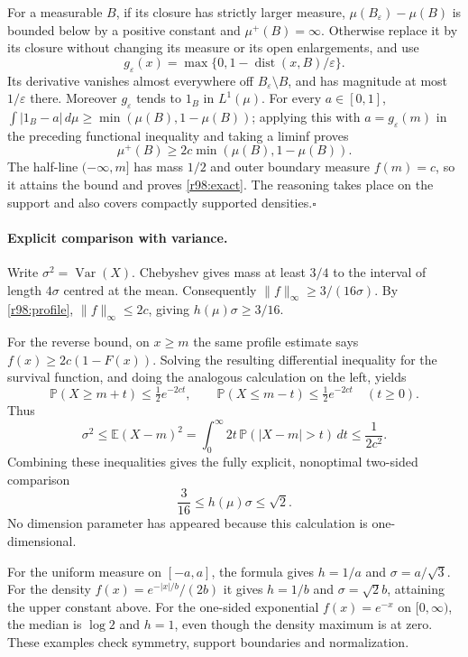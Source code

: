 \documentclass[11pt]{article}
\begin{document}
For a measurable $B$, if its closure has strictly larger measure,
$\mu(B_\varepsilon)-\mu(B)$ is bounded below by a positive constant
and $\mu^+(B)=\infty$. Otherwise replace it by its closure without
changing its measure or its open enlargements, and use
\[
                 g_\varepsilon(x)=
                 \max\{0,1-\operatorname{dist}(x,B)/\varepsilon\}.
\]
Its derivative vanishes almost everywhere off
$B_\varepsilon\setminus B$, and has magnitude at most
$1/\varepsilon$ there. Moreover $g_\varepsilon$ tends to $1_B$ in
$L^1(\mu)$. For every $a\in[0,1]$,
$\int|1_B-a|\,d\mu\ge\min(\mu(B),1-\mu(B))$; applying this with
$a=g_\varepsilon(m)$ in the preceding functional inequality and
taking a liminf proves
\[
                  \mu^+(B)\ge2c\min(\mu(B),1-\mu(B)).
\]
The half-line $(-\infty,m]$ has mass $1/2$ and outer boundary measure
$f(m)=c$, so it attains the bound and proves \eqref{r98:exact}.
The reasoning takes place on the support and also covers compactly
supported densities.\hfill$\square$

\paragraph{Explicit comparison with variance.}
Write $\sigma^2=\operatorname{Var}(X)$. Chebyshev gives mass at least
$3/4$ to the interval of length $4\sigma$ centred at the mean.
Consequently $\|f\|_\infty\ge3/(16\sigma)$. By
\eqref{r98:profile}, $\|f\|_\infty\le2c$, giving
$h(\mu)\sigma\ge3/16$.

For the reverse bound, on $x\ge m$ the same profile estimate says
$f(x)\ge2c(1-F(x))$. Solving the resulting differential inequality
for the survival function, and doing the analogous calculation on
the left, yields
\[
 \mathbb P(X\ge m+t)\le\tfrac12e^{-2ct},\qquad
 \mathbb P(X\le m-t)\le\tfrac12e^{-2ct}\quad(t\ge0).
\]
Thus
\[
 \sigma^2\le\mathbb E(X-m)^2
   =\int_0^\infty2t\,\mathbb P(|X-m|>t)\,dt
   \le\frac1{2c^2}.
\]
Combining these inequalities gives the fully explicit, nonoptimal
two-sided comparison
\begin{equation}\label{r98:variance}
                  \frac3{16}\le h(\mu)\sigma\le\sqrt2.
\end{equation}
No dimension parameter has appeared because this calculation is
one-dimensional.

For the uniform measure on $[-a,a]$, the formula gives $h=1/a$ and
$\sigma=a/\sqrt3$. For the density
$f(x)=e^{-|x|/b}/(2b)$ it gives $h=1/b$ and
$\sigma=\sqrt2b$, attaining the upper constant above. For the
one-sided exponential $f(x)=e^{-x}$ on $[0,\infty)$, the median is
$\log2$ and $h=1$, even though the density maximum is at zero.
These examples check symmetry, support boundaries and normalization.
\end{document}
